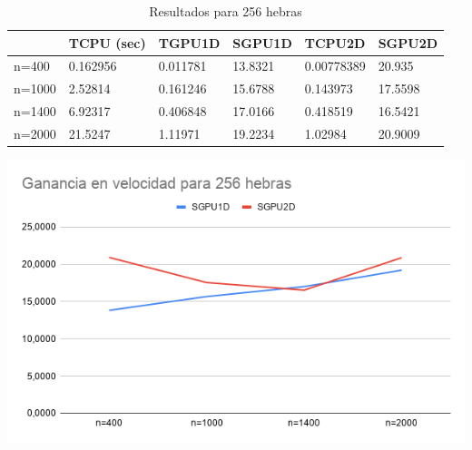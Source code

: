 \begin{table}[H]
	\centering
	\begin{tabular}{|l|l|l|l|l|l|}
		\hline
		& \cellcolor[HTML]{ECF4FF}TCPU (sec) & \cellcolor[HTML]{ECF4FF}TGPU1D & \cellcolor[HTML]{ECF4FF}SGPU1D & \cellcolor[HTML]{ECF4FF}TCPU2D & \cellcolor[HTML]{ECF4FF}SGPU2D \\ \hline
		\cellcolor[HTML]{FFFFC7}n=400  & 0.162956                           & 0.011781                       & 13.8321                        & 0.00778389                     & 20.935                         \\ \hline
		\cellcolor[HTML]{FFFFC7}n=1000 & 2.52814                            & 0.161246                       & 15.6788                        & 0.143973                       & 17.5598                        \\ \hline
		\cellcolor[HTML]{FFFFC7}n=1400 & 6.92317                            & 0.406848                       & 17.0166                        & 0.418519                       & 16.5421                        \\ \hline
		\cellcolor[HTML]{FFFFC7}n=2000 & 21.5247                            & 1.11971                        & 19.2234                        & 1.02984                        & 20.9009                        \\ \hline
	\end{tabular}
	\caption{Resultados para 256 hebras}
\end{table}

\begin{center}
	\includegraphics[scale=0.5]{img/g256}
\end{center}

